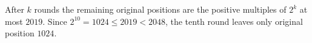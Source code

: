 After $k$ rounds the remaining original positions are the positive multiples of $2^k$ at most $2019$. Since $2^{10}=1024\le2019<2048$, the tenth round leaves only original position $\boxed{1024}$.
